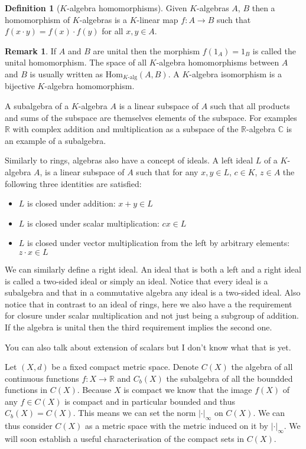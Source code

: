 \documentclass[11pt,a4paper]{article}
\theoremstyle{definition}
\newtheorem{definition}{Definition}[section]
\newtheorem{remark}{Remark}[section]
\theoremstyle{plain}
\newcommand{\R}{\mathbb{R}}
\newcommand{\C}{\mathbb{C}}
\begin{document}
  \begin{definition}[$K$-algebra homomorphisms]
    Given $K$-algebras $A$, $B$ then a homomorphism of $K$-algebras
    is a $K$-linear map $f \colon A \to B$ such that 
    $f(x \cdot y)=f(x) \cdot f(y)$ for all $x,y \in A$.
  \end{definition}
  \begin{remark}
    If $A$ and $B$ are unital then the morphism
    $f(1_A) = 1_B$ is called the unital homomorphism. The space
    of all $K$-algebra homomorphisms between $A$ and $B$ is usually 
    written as ${\mathrm{Hom}}_{K\text{-alg}}(A,B)$. A $K$-algebra
    isomorphism is a bijective $K$-algebra homomorphism.
  \end{remark}
  A subalgebra of a $K$-algebra $A$ is a linear subspace of $A$ such
  that all products and sums of the subspace are themselves elements
  of the subspace. For examples $\R$ with complex addition and 
  multiplication as a subspace of the $\R$-algebra $\C$ is an example
  of a subalgebra.

  Similarly to rings, algebras also have a concept of ideals. A left ideal
  $L$ of a $K$-algebra $A$, is a linear subspace of $A$ such that for
  any $x,y \in L$, $c \in K$, $z \in A$ the following three identities
  are satisfied:
  \begin{itemize}
    \item $L$ is closed under addition: $x + y \in L$
    \item $L$ is closed under scalar multiplication: $cx \in L$
    \item $L$ is closed under vector multiplication from the left
    by arbitrary elements: $z \cdot x \in L$
  \end{itemize}
  We can similarly define a right ideal. An ideal that is both a left and
  a right ideal is called a two-sided ideal or simply an ideal. Notice
  that every ideal is a subalgebra and that in a commutative algebra
  any ideal is a two-sided ideal. Also notice that in contrast to an
  ideal of rings, here we also have a the requirement for closure under
  scalar multiplication and not just being a subgroup of addition.
  If the algebra is unital then the third requirement implies the second
  one.

  You can also talk about extension of scalars but I don't know what
  that is yet.

  Let $(X,d)$ be a fixed compact metric space. Denote $C(X)$ the algebra
  of all continuous functions $f \colon X \to \R$ and $C_b(X)$ the
  subalgebra of all the boundded functions in $C(X)$. Because $X$
  is compact we know that the image $f(X)$ of any $f \in C(X)$ is compact
  and in particular bounded and thus $C_b(X) = C(X)$. This means we can set 
  the norm $|\cdot|_\infty$ on $C(X)$. We can thus consider $C(X)$ as
  a metric space with the metric induced on it by $|\cdot|_\infty$.
  We will soon establish a useful characterisation of the compact sets
  in $C(X)$.
\end{document}
